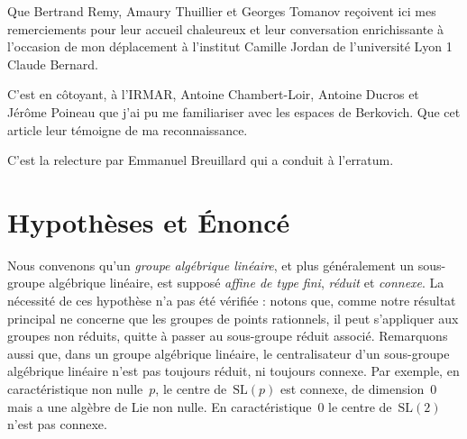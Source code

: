 \documentclass[french]{amsart}
\newcommand{\SL}{\mathrm{SL}}
\begin{document}
Que Bertrand Remy, Amaury Thuillier et Georges Tomanov reçoivent ici mes
remerciements pour leur accueil chaleureux et leur conversation enrichissante à
l'occasion de mon déplacement à l'institut Camille Jordan de l'université Lyon 1
Claude Bernard.

C'est en côtoyant, à l'IRMAR, Antoine Chambert-Loir, Antoine Ducros et Jérôme
Poineau que j'ai pu me familiariser avec les espaces de Berkovich. Que cet article
leur témoigne de ma reconnaissance.

C’est la relecture par Emmanuel Breuillard qui a conduit à l’erratum.

\section{Hypothèses et Énoncé}

Nous convenons qu'un \emph{groupe algébrique linéaire}, et plus généralement un sous-groupe algébrique linéaire, est supposé \emph{affine de type fini}, \emph{réduit} et \emph{connexe}.
La nécessité de ces hypothèse n'a pas été vérifiée : notons que, 
comme notre résultat principal ne concerne que les groupes de points rationnels, il peut s'appliquer aux groupes non réduits, quitte à passer au sous-groupe réduit associé. Remarquons aussi que, dans un groupe algébrique linéaire, le centralisateur d'un sous-groupe algébrique linéaire n'est pas toujours réduit, ni toujours connexe. Par exemple, en caractéristique non nulle~$p$, le centre de~$\SL(p)$ est connexe, de dimension~$0$ mais a une algèbre de Lie
non nulle. En caractéristique~$0$ le centre de~$\SL(2)$ n’est pas connexe.
\end{document}
